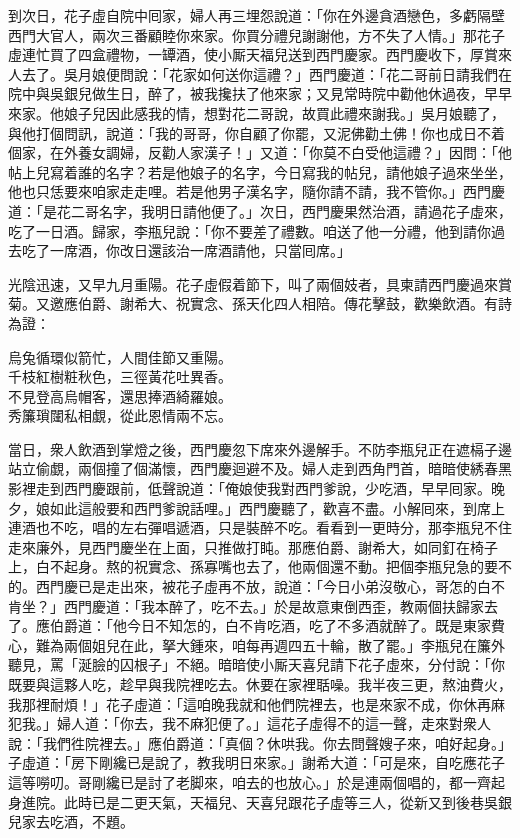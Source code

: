到次日，花子虛自院中囘家，婦人再三埋怨說道：「你在外邊貪酒戀色，多虧隔壁西門大官人，兩次三番顧睦你來家。你買分禮兒謝謝他，方不失了人情。」那花子虛連忙買了四盒禮物，一罈酒，使小厮天福兒送到西門慶家。西門慶收下，厚賞來人去了。吳月娘便問說：「花家如何送你這禮？」西門慶道：「花二哥前日請我們在院中與吳銀兒做生日，醉了，被我攙扶了他來家；又見常時院中勸他休過夜，早早來家。他娘子兒因此感我的情，想對花二哥說，故買此禮來謝我。」{}吳月娘聽了，與他打個問訊，說道：「我的哥哥，你自顧了你罷，又泥佛勸土佛！你也成日不着個家，在外養女調婦，反勸人家漢子！」又道：「你莫不白受他這禮？」因問：「他帖上兒寫着誰的名字？若是他娘子的名字，今日寫我的帖兒，請他娘子過來坐坐，他也只恁要來咱家走走哩。{}若是他男子漢名字，隨你請不請，我不管你。」西門慶道：「是花二哥名字，我明日請他便了。」次日，西門慶果然治酒，請過花子虛來，吃了一日酒。歸家，李瓶兒說：「你不要差了禮數。咱送了他一分禮，他到請你過去吃了一席酒，你改日還該治一席酒請他，只當囘席。」

光陰迅速，又早九月重陽。花子虛假着節下，叫了兩個妓者，具柬請西門慶過來賞菊。又邀應伯爵、謝希大、祝實念、孫天化四人相陪。傳花擊鼓，歡樂飲酒。有詩為證：

\begin{myquote}
烏兔循環似箭忙，人間佳節又重陽。\\千枝紅樹粧秋色，三徑黃花吐異香。\\不見登高烏帽客，還思捧酒綺羅娘。\\秀簾瑣闥私相覷，從此恩情兩不忘。
\end{myquote}

當日，衆人飲酒到掌燈之後，西門慶忽下席來外邊解手。不防李瓶兒正在遮槅子邊站立偷覷，兩個撞了個滿懷，{}西門慶迴避不及。婦人走到西角門首，暗暗使綉春黑影裡走到西門慶跟前，低聲說道：「俺娘使我對西門爹說，少吃酒，早早囘家。晚夕，娘如此這般要和西門爹說話哩。」西門慶聽了，歡喜不盡。小解囘來，到席上連酒也不吃，唱的左右彈唱遞酒，只是裝醉不吃。看看到一更時分，那李瓶兒不住走來廉外，見西門慶坐在上面，只推做打盹。那應伯爵、謝希大，如同釘在椅子上，白不起身。熬的祝實念、孫寡嘴也去了，他兩個還不動。把個李瓶兒急的要不的。西門慶已是走出來，被花子虛再不放，說道：「今日小弟沒敬心，哥怎的白不肯坐？」西門慶道：「我本醉了，吃不去。」於是故意東倒西歪，教兩個扶歸家去了。應伯爵道：「他今日不知怎的，白不肯吃酒，吃了不多酒就醉了。既是東家費心，難為兩個姐兒在此，拏大鍾來，咱每再週四五十輪，散了罷。」李瓶兒在簾外聽見，罵「涎臉的囚根子」不絕。暗暗使小厮天喜兒請下花子虛來，分付說：「你既要與這夥人吃，趁早與我院裡吃去。休要在家裡聒噪。我半夜三更，熬油費火，我那裡耐煩！」花子虛道：「這咱晚我就和他們院裡去，也是來家不成，你休再麻犯我。」婦人道：「你去，我不麻犯便了。」這花子虛得不的這一聲，走來對衆人說：「我們徃院裡去。」應伯爵道：「真個？休哄我。你去問聲嫂子來，咱好起身。」子虛道：「房下剛纔已是說了，教我明日來家。」謝希大道：「可是來，自吃應花子這等嘮叨。哥剛纔已是討了老脚來，咱去的也放心。」於是連兩個唱的，都一齊起身進院。此時已是二更天氣，天福兒、天喜兒跟花子虛等三人，從新又到後巷吳銀兒家去吃酒，不題。

